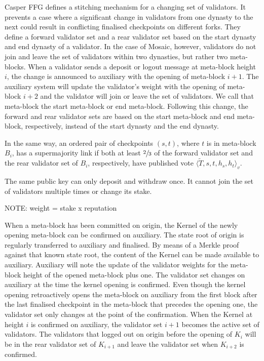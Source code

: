 \documentclass[12pt,a4paper]{article}
\begin{document}
Casper FFG\cite{casperffg} defines a stitching mechanism for a changing set of validators.
It prevents a case where a significant change in validators from one dynasty to the next could result in conflicting finalised checkpoints on different forks.
They define a forward validator set and a rear validator set based on the start dynasty and end dynasty of a validator.
In the case of Mosaic, however, validators do not join and leave the set of validators within two dynasties, but rather two meta-blocks.
When a validator sends a deposit or logout message at meta-block height $i$, the change is announced to auxiliary with the opening of meta-block $i+1$.
The auxiliary system will update the validator's weight with the opening of meta-block $i+2$ and the validator will join or leave the set of validators. We call that meta-block the start meta-block or end meta-block.
Following this change, the forward and rear validator sets are based on the start meta-block and end meta-block, respectively, instead of the start dynasty and the end dynasty.

 In the same way, an ordered pair of checkpoints $(s, t)$, where $t$ is in meta-block $B_i$, has a supermajority link if both at least $\sfrac{2}{3}$ of the forward validator set and the rear validator set of $B_i$, respectively, have published vote $\langle \tilde{T}, s, t, h_{s}, h_{t}\rangle_v$.

The same public key can only deposit and withdraw once.
It cannot join the set of validators multiple times or change its stake.

NOTE: weight = stake x reputation

When a meta-block has been committed on origin, the Kernel of the newly opening meta-block can be confirmed on auxiliary.
The state root of origin is regularly transferred to auxiliary and finalised.
By means of a Merkle proof against that known state root, the content of the Kernel can be made available to auxiliary.
Auxiliary will note the update of the validator weights for the meta-block height of the opened meta-block plus one.
The validator set changes on auxiliary at the time the kernel opening is confirmed.
Even though the kernel opening retroactively opens the meta-block on auxiliary from the first block after the last finalised checkpoint in the meta-block that precedes the opening one, the validator set only changes at the point of the confirmation.
When the Kernel at height $i$ is confirmed on auxiliary, the validator set $i+1$ becomes the active set of validators.
The validators that logged out on origin before the opening of $K_i$ will be in the rear validator set of $K_{i+1}$ and leave the validator set when $K_{i+2}$ is confirmed.
\end{document}

